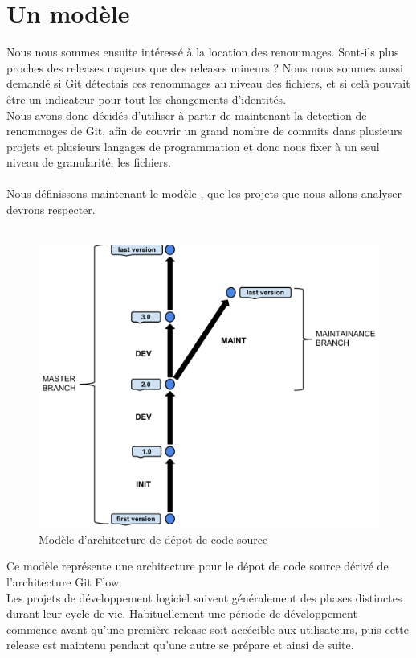 \section{Un modèle}
\label{sec:model}

Nous nous sommes ensuite intéressé à la location des renommages. Sont-ils plus proches des releases majeurs que des releases mineurs ? Nous nous sommes aussi demandé si Git détectais ces renommages au niveau des fichiers, et si celà pouvait être un indicateur pour tout les changements d'identités.\\
Nous avons donc décidés d'utiliser à partir de maintenant la detection de renommages de Git, afin de couvrir un grand nombre de commits dans plusieurs projets et plusieurs langages de programmation et donc nous fixer à un seul niveau de granularité, les fichiers.\\\\
Nous définissons maintenant le modèle , que les projets que nous allons analyser devrons respecter.\\\\
\begin{figure}[t]
  \centering
  \includegraphics[scale=0.5]{data/figures/periods.pdf}
	\caption{Modèle d'architecture de dépot de code source}
	\label{fig:model}
\end{figure}
Ce modèle représente une architecture pour le dépot de code source dérivé de l'architecture Git Flow.\\
Les projets de développement logiciel suivent généralement des phases distinctes durant leur cycle de vie. Habituellement une période de développement commence avant qu'une première release soit accécible aux utilisateurs, puis cette release est maintenu pendant qu'une autre se prépare et ainsi de suite.\\   
